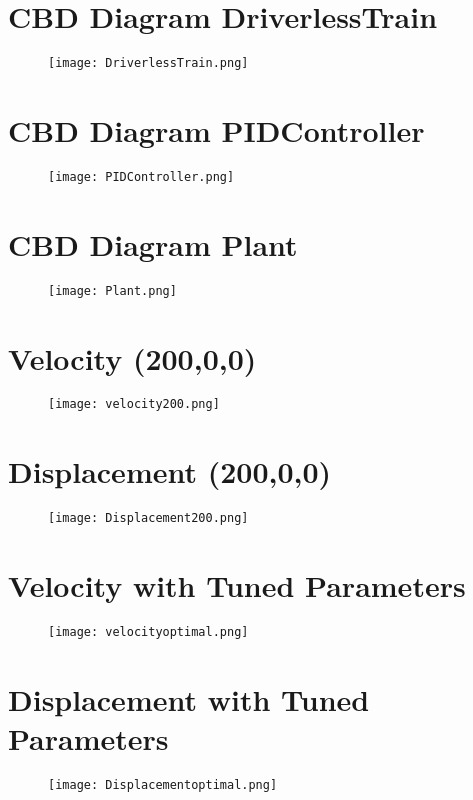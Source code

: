 \documentclass{article}
\begin{document}
\begin{appendices}
\section{CBD Diagram DriverlessTrain}
\label{appendix:DiagramDriverless}
\begin{figure}[!ht]
  \centering
  \texttt{[image: DriverlessTrain.png]}  
\end{figure}

\section{CBD Diagram PIDController}
\label{appendix:DiagramPID}
\begin{figure}[!ht]
  \centering
  \texttt{[image: PIDController.png]}  
\end{figure}

\section{CBD Diagram Plant}
\label{appendix:DiagramPlant}
\begin{figure}[!ht]
  \centering
  \texttt{[image: Plant.png]}  
\end{figure}

\section{Velocity (200,0,0)}
\label{appendix:Velocity200}
\begin{figure}[!ht]
  \centering
  \texttt{[image: velocity200.png]}  
\end{figure}
\section{Displacement (200,0,0)}
\label{appendix:Displacement200}
\begin{figure}[!ht]
  \centering
  \texttt{[image: Displacement200.png]}  
\end{figure}
\pagebreak
\section{Velocity with Tuned Parameters}
\label{appendix:VelocityOpt}
\begin{figure}[!ht]
  \centering
  \texttt{[image: velocityoptimal.png]}  
\end{figure}
\section{Displacement with Tuned Parameters}
\label{appendix:DisplacementOpt}
\begin{figure}[!ht]
  \centering
  \texttt{[image: Displacementoptimal.png]}  
\end{figure}
\pagebreak

\end{appendices}
\end{document}
